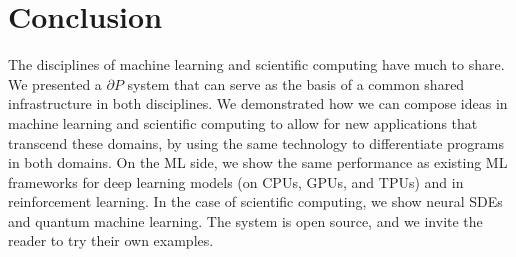 \documentclass{juliacon}
\begin{document}
\begin{comment}
\begin{lstlisting}[
    frame=lines,
    framesep=2mm,
    fontsize=\footnotesize,
    fontfamily=fdm,
    xleftmargin=6pt,
    escapeinside=,mathescape=true
    ]{Julia}
julia> guess = PointLight(Vec3(1.0), 20000.0, Vec3(1.0, 2.0, -7.0))

julia> function loss_function(light)
           rendered_color = raytrace(origin, direction, scene, light, eye_pos)
           rendered_img = process_image(rendered_color, screen_size.w,
                                        screen_size.h)
           return mean((rendered_img .- reference_img).^2)
       end

julia> gs = gradient(x -> loss_function(x, image), guess)   
\end{lstlisting}

In our examples we have used our prototype renderer to demonstrate optimization of the position of a point light source, given the desired final rendered image. We define a loss function that accepts a point light source as input, renders the scene, and compares it to a reference image. As usual, gradients are then trivial and we can begin to update the position of the point source.

\begin{figure}[!htb]
\minipage{0.32\textwidth}
  \texttt{[image: images/triangle\_initial\_guess.jpg]}
  \caption{Initial Guess}\label{fig:raytracer1}
\endminipage\hfill
\minipage{0.32\textwidth}
  \texttt{[image: images/triangle\_100.jpg]}
  \caption{After 100 iterations}\label{fig:raytracer2}
\endminipage\hfill
\minipage{0.32\textwidth}%
  \texttt{[image: images/triangle\_original.jpg]}
  \caption{Target Image}\label{fig:raytracer3}
\endminipage
\end{figure}

\end{comment}


\section{Conclusion}

The disciplines of machine learning and scientific computing have much to share. We presented a $\partial P$ system that can serve as the basis of a common shared infrastructure in both disciplines. We demonstrated how we  can compose ideas in machine learning and scientific computing to allow for new applications that transcend these domains, by using the same technology to differentiate programs in both domains. On the ML side, we show the same performance as existing ML frameworks for deep learning models (on CPUs, GPUs, and TPUs) and in reinforcement learning. In the case of scientific computing, we show neural SDEs and quantum machine learning. The system is open source, and we invite the reader to try their own examples.
\end{document}
